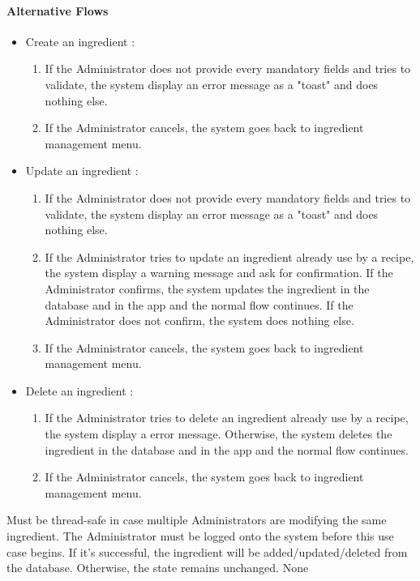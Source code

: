 {  \paragraph{Alternative Flows}
  \begin{itemize}
    \item Create an ingredient :
    \begin{enumerate}
      \item If the Administrator does not provide every mandatory fields and tries to validate, the system display an error message as a "toast" and does nothing else.
      \item If the Administrator cancels, the system goes back to ingredient management menu.
    \end{enumerate}
    \item Update an ingredient :
    \begin{enumerate}
      \item If the Administrator does not provide every mandatory fields and tries to validate, the system display an error message as a "toast" and does nothing else.
      \item If the Administrator tries to update an ingredient already use by a recipe, the system display a warning message and ask for confirmation. If the Administrator confirms, the system updates the ingredient in the database and in the app and the normal flow continues. If the Administrator does not confirm, the system does nothing else.
      \item If the Administrator cancels, the system goes back to ingredient management menu.
    \end{enumerate}
    \item Delete an ingredient :
    \begin{enumerate}
      \item If the Administrator tries to delete an ingredient already use by a recipe, the system display a error message. Otherwise, the system deletes the ingredient in the database and in the app and the normal flow continues.
      \item If the Administrator cancels, the system goes back to ingredient management menu.
    \end{enumerate}
  \end{itemize}
}
{Must be thread-safe in case multiple Administrators are modifying the same ingredient.}
{The Administrator must be logged onto the system before this use case begins.}
{If it's successful, the ingredient will be added/updated/deleted from the database. Otherwise, the state remains unchanged.}
{None}

